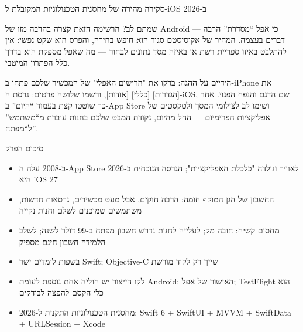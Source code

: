 \begin{center}\small\color{gray}סקירה מהירה של מחסנית הטכנולוגיות המקובלת ל-iOS ב-2026\end{center}

שמתם לב? הרשימה הזאת קצרה בהרבה מזו של Android — כי אפל “מסדרת” הרבה דברים בעצמה. המחיר של אקוסיסטם סגור הוא חופש בחירה, והפרס הוא שקט נפשי: אין להתלבט באיזו ספריית רשת או באיזה מסד נתונים לבחור — מה שאפל מספקת הוא בדרך כלל הפתרון המיטבי.

\begin{tcbpractice}{הידיים על ההגה: בדקו את "הרישום האפלי" של המכשיר שלכם}
פתחו ב-iPhone את [הגדרות] [כללי] [אודות], ורשמו שלושה פרטים: גרסת ה-iOS, שם הדגם והנפח הפנוי. אחר כך שוטטו קצת בעמוד “היום” ב-App Store ושימו לב לצילומי המסך ולטקסטים של אפליקציות הפרימיום — החל מהיום, נקודת המבט שלכם בחנות עוברת מ“משתמש” ל“מפתח”.

\end{tcbpractice}

\begin{tcbsummary}{סיכום הפרק}
\begin{itemize}
  \item ב-2008 עלה ה-App Store לאוויר ונולדה "כלכלת האפליקציות"; הגרסה הנוכחית ב-2026 היא iOS 27
  \item החשבון של הגן המוקף חומה: הרבה חוקים, אבל מעט מכשירים, גרסאות חדשות, משתמשים שמוכנים לשלם וחנות נקייה
  \item מחסום קשיח: חובה מק; לעלייה לחנות נדרש חשבון מפתח ב-99 דולר לשנה; לשלב הלמידה חשבון חינם מספיק
  \item בשפות לומדים ישר Swift; Objective-C שייך רק לקוד מורשת
  \item לקו הייצור יש חוליה אחת נוספת לעומת Android: האישור של אפל; TestFlight הוא כלי הקסם להפצה לבודקים
  \item מחסנית הטכנולוגיות התקנית ל-2026: Swift 6 + SwiftUI + MVVM + SwiftData + URLSession + Xcode
\end{itemize}

\end{tcbsummary}
